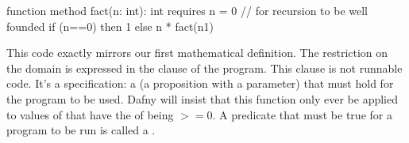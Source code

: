 \documentclass[letterpaper,10pt,english]{sphinxmanual}
\begin{document}
\begin{sphinxVerbatim}[commandchars=\\\{\}]
function method fact(n: int): int
   requires n \PYGZgt{}= 0 // for recursion to be well founded
\PYGZob{}
    if (n==0) then 1
    else n * fact(n\PYGZhy{}1)
\PYGZcb{}
\end{sphinxVerbatim}

This code exactly mirrors our first mathematical definition. The
restriction on the domain is expressed in the  clause of the
program. This clause is not runnable code. It’s a specification: a
 (a proposition with a parameter) that must hold for the
program to be used. Dafny will insist that this function only ever be
applied to values of  that have the  of being \(>=
0\). A predicate that must be true for a program to be run is called a
.
\end{document}
